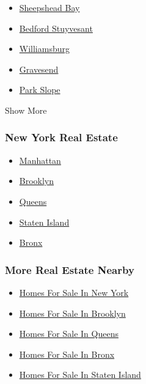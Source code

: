 \begin{itemize}
\tightlist
\item
  \href{/real-estate/usa/ny/brooklyn/sheepshead-bay/homes-for-sale}{Sheepshead
  Bay}
\item
  \href{/real-estate/usa/ny/brooklyn/bedford-stuyvesant/homes-for-sale}{Bedford
  Stuyvesant}
\item
  \href{/real-estate/usa/ny/brooklyn/williamsburg/homes-for-sale}{Williamsburg}
\item
  \href{/real-estate/usa/ny/brooklyn/gravesend/homes-for-sale}{Gravesend}
\item
  \href{/real-estate/usa/ny/brooklyn/park-slope/homes-for-sale}{Park
  Slope}
\end{itemize}

Show More

\hypertarget{new-york-real-estate}{%
\subsubsection{New York Real Estate}\label{new-york-real-estate}}

\begin{itemize}
\tightlist
\item
  \href{/real-estate/usa/ny/new-yorknew-york-ny-usa/homes-for-sale}{Manhattan}
\item
  \href{/real-estate/usa/ny/brooklynbrooklyn-ny-usa/homes-for-sale}{Brooklyn}
\item
  \href{/real-estate/usa/ny/queensqueens-ny-usa/homes-for-sale}{Queens}
\item
  \href{/real-estate/usa/ny/staten-islandstaten-island-ny-usa/homes-for-sale}{Staten
  Island}
\item
  \href{/real-estate/usa/ny/bronxbronx-ny-usa/homes-for-sale}{Bronx}
\end{itemize}

\hypertarget{more-real-estate-nearby}{%
\subsubsection{More Real Estate Nearby}\label{more-real-estate-nearby}}

\begin{itemize}
\tightlist
\item
  \href{/real-estate/usa/ny/new-yorknew-york-ny-usa/homes-for-sale}{Homes
  For Sale In New York}
\item
  \href{/real-estate/usa/ny/brooklynbrooklyn-ny-usa/homes-for-sale}{Homes
  For Sale In Brooklyn}
\item
  \href{/real-estate/usa/ny/queensqueens-ny-usa/homes-for-sale}{Homes
  For Sale In Queens}
\item
  \href{/real-estate/usa/ny/bronxbronx-ny-usa/homes-for-sale}{Homes For
  Sale In Bronx}
\item
  \href{/real-estate/usa/ny/staten-islandstaten-island-ny-usa/homes-for-sale}{Homes
  For Sale In Staten Island}
\end{itemize}

